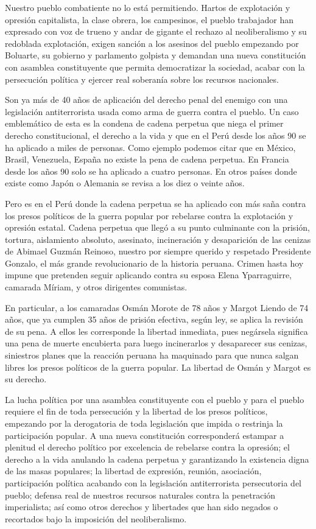 \documentclass[
  letterpaper,
  DIV=11,
  numbers=noendperiod]{scrartcl}
\begin{document}
Nuestro pueblo combatiente no lo está permitiendo. Hartos de explotación
y opresión capitalista, la clase obrera, los campesinos, el pueblo
trabajador han expresado con voz de trueno y andar de gigante el rechazo
al neoliberalismo y su redoblada explotación, exigen sanción a los
asesinos del pueblo empezando por Boluarte, su gobierno y parlamento
golpista y demandan una nueva constitución con asamblea constituyente
que permita democratizar la sociedad, acabar con la persecución política
y ejercer real soberanía sobre los recursos nacionales.

Son ya más de 40 años de aplicación del derecho penal del enemigo con
una legislación antiterrorista usada como arma de guerra contra el
pueblo. Un caso emblemático de esta es la condena de cadena perpetua que
niega el primer derecho constitucional, el derecho a la vida y que en el
Perú desde los años 90 se ha aplicado a miles de personas. Como ejemplo
podemos citar que en México, Brasil, Venezuela, España no existe la pena
de cadena perpetua. En Francia desde los años 90 solo se ha aplicado a
cuatro personas. En otros países donde existe como Japón o Alemania se
revisa a los diez o veinte años.

Pero es en el Perú donde la cadena perpetua se ha aplicado con más saña
contra los presos políticos de la guerra popular por rebelarse contra la
explotación y opresión estatal. Cadena perpetua que llegó a su punto
culminante con la prisión, tortura, aislamiento absoluto, asesinato,
incineración y desaparición de las cenizas de Abimael Guzmán Reinoso,
nuestro por siempre querido y respetado Presidente Gonzalo, el más
grande revolucionario de la historia peruana. Crimen hasta hoy impune
que pretenden seguir aplicando contra su esposa Elena Yparraguirre,
camarada Míriam, y otros dirigentes comunistas.

En particular, a los camaradas Osmán Morote de 78 años y Margot Liendo
de 74 años, que ya cumplen 35 años de prisión efectiva, según ley, se
aplica la revisión de su pena. A ellos les corresponde la libertad
inmediata, pues negársela significa una pena de muerte encubierta para
luego incinerarlos y desaparecer sus cenizas, siniestros planes que la
reacción peruana ha maquinado para que nunca salgan libres los presos
políticos de la guerra popular. La libertad de Osmán y Margot es su
derecho.

La lucha política por una asamblea constituyente con el pueblo y para el
pueblo requiere el fin de toda persecución y la libertad de los presos
políticos, empezando por la derogatoria de toda legislación que impida o
restrinja la participación popular. A una nueva constitución
corresponderá estampar a plenitud el derecho político por excelencia de
rebelarse contra la opresión; el derecho a la vida anulando la cadena
perpetua y garantizando la existencia digna de las masas populares; la
libertad de expresión, reunión, asociación, participación política
acabando con la legislación antiterrorista persecutoria del pueblo;
defensa real de nuestros recursos naturales contra la penetración
imperialista; así como otros derechos y libertades que han sido negados
o recortados bajo la imposición del neoliberalismo.
\end{document}
